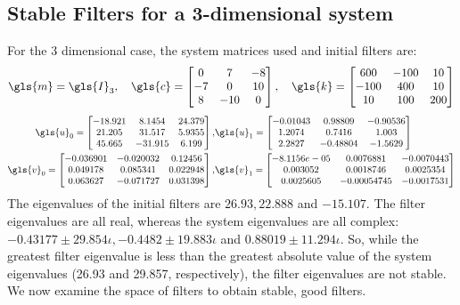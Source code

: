 \subsection{Stable Filters for a 3-dimensional system}
For the 3 dimensional case, the system matrices used \citep{Garvey2008}
and initial filters are:
\begin{align}
	\gls{m} = \gls{I}_3,
	\quad
	\gls{c}= \begin{bmatrix}
	0 & 7 & -8\\
	-7 & 0 & 10\\
	8 & -10 & 0
	\end{bmatrix},\quad
	\gls{k} = \begin{bmatrix}
	600 & -100 & 10\\
	-100 & 400 & 10\\
	10 & 100 & 200
	\end{bmatrix}
\end{align}
\begin{align}
\gls{u}_0 = \begin{bmatrix}	
      -18.921   &    8.1454   &    24.379\\
       21.205    &   31.517  &     5.9355\\
       45.665    &  -31.915  &      6.199
	\end{bmatrix}, &
\gls{u}_1 = \begin{bmatrix}
     -0.01043  &    0.98809  &   -0.90536\\
       1.2074  &     0.7416  &      1.003\\
       2.2827  &   -0.48804  &    -1.5629
	\end{bmatrix}\\
\gls{v}_0 = \begin{bmatrix}	
    -0.036901  &  -0.020032  &    0.12456\\
     0.049178  &   0.085341  &   0.022948\\
     0.063627  &  -0.071727  &   0.031398
	\end{bmatrix}, &
\gls{v}_1 = \begin{bmatrix}
  -8.1156e-05  &  0.0076881 &  -0.0070443\\
     0.003052 &   0.0018746 &   0.0025354\\
    0.0025605 & -0.00054745 &  -0.0017531	
	\end{bmatrix}
\end{align}
The eigenvalues of the initial filters are $26.93, 22.888$ and $-15.107$. 
The filter eigenvalues are all real, whereas the system eigenvalues are 
all complex: $-0.43177 \pm 29.854\iota, -0.4482 \pm 19.883\iota$ and 
$0.88019 \pm 11.294\iota$. So, while the greatest filter eigenvalue is less than the greatest absolute value of the system eigenvalues (26.93 and 29.857, respectively), the filter eigenvalues are not stable. We now examine the space of filters to obtain stable, good filters.

